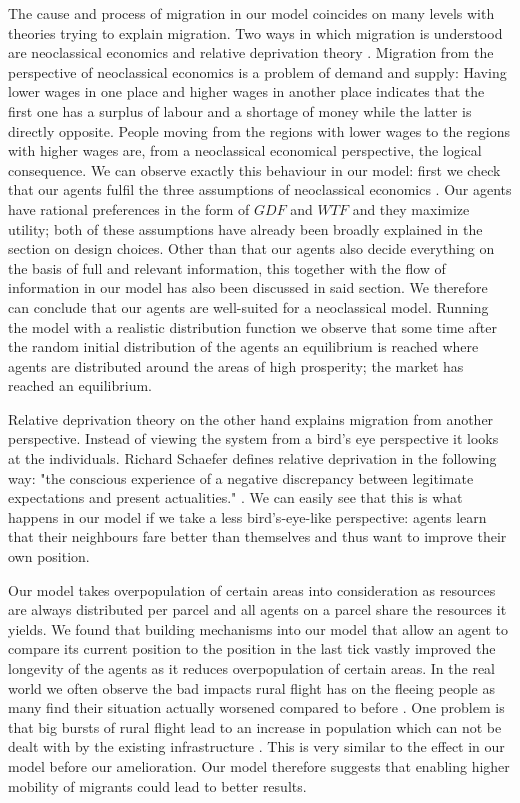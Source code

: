 \documentclass{JASSS}
\newcommand{\gdf}{\mathit{GDF}}
\newcommand{\wtf}{\mathit{WTF}}
\begin{document}
The cause and process of migration in our model coincides on many levels with theories trying to explain migration. Two ways in which migration is understood are neoclassical economics and relative deprivation theory \citep{jennissen}. Migration from the perspective of neoclassical economics is a problem of demand and supply: Having lower wages in one place and higher wages in another place indicates that the first one has a surplus of labour and a shortage of money while the latter is directly opposite. People moving from the regions with lower wages to the regions with higher wages are, from a neoclassical economical perspective, the logical consequence. We can observe exactly this behaviour in our model: first we check that our agents fulfil the three assumptions of neoclassical economics \citep{weintraub}. Our agents have rational preferences in the form of $\gdf$ and $\wtf$ and they maximize utility; both of these assumptions have already been broadly explained in the section on design choices. Other than that our agents also decide everything on the basis of full and relevant information, this together with the flow of information in our model has also been discussed in said section. We therefore can conclude that our agents are well-suited for a neoclassical model. Running the model with a realistic distribution function we observe that some time after the random initial distribution of the agents an equilibrium is reached where agents are distributed around the areas of high prosperity; the market has reached an equilibrium.

Relative deprivation theory on the other hand explains migration from another perspective. Instead of viewing the system from a bird's eye perspective it looks at the individuals. Richard Schaefer defines relative deprivation in the following way: "the conscious experience of a negative discrepancy between legitimate expectations and present actualities." \citep{schaefer}. We can easily see that this is what happens in our model if we take a less bird's-eye-like perspective: agents learn that their neighbours fare better than themselves and thus want to improve their own position.

Our model takes overpopulation of certain areas into consideration as resources are always distributed per parcel and all agents on a parcel share the resources it yields. We found that building mechanisms into our model that allow an agent to compare its current position to the position in the last tick vastly improved the longevity of the agents as it reduces overpopulation of certain areas. In the real world we often observe the bad impacts rural flight has on the fleeing people as many find their situation actually worsened compared to before \citep{weeks}. One problem is that big bursts of rural flight lead to an increase in population which can not be dealt with by the existing infrastructure \citep{harris}. This is very similar to the effect in our model before our amelioration. Our model therefore suggests that enabling higher mobility of migrants could lead to better results.
\end{document}
